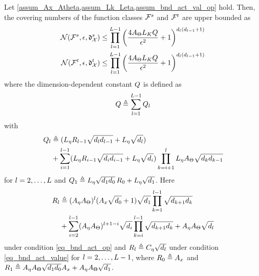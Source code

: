 \documentclass[review,supplement,onefignum,onetabnum]{siamonline250211}
\begin{document}
\begin{lemma} 
    \label{lem_cov_num_Fs_Ft}
    Let \cref{assum_Ax_Atheta,assum_Lk_Leta,assum_bnd_act_val_op} hold. Then, the covering numbers of the function classes $\mathcal{F}^s$ and $\mathcal{F}^t$ are upper bounded as 
    \begin{equation*}
    \begin{split}
    \mathcal{N} (  \mathcal{F}^s, \epsilon, \mathfrak{d}^s_{\mathcal{X}} ) \leq \prod_{l=1}^{L-1}  \left( \frac{4 {A_\Theta}  L_K {Q}}{\epsilon^2}+1  \right)^{ {d_l}({d_{l-1}}+1) } \\
    \mathcal{N}(  \mathcal{F}^t, \epsilon, \mathfrak{d}^t_{\mathcal{X}} ) \leq \prod_{l=1}^{L-1}  \left( \frac{4 {A_\Theta}  L_K {Q}}{\epsilon^2}+1  \right)^{ {d_l}({d_{l-1}}+1) }
    \end{split}
    \end{equation*}
    where the dimension-dependent constant ${Q}$ is defined as
    \begin{equation*}
    \begin{split}
    {Q} \triangleq 
    \sum_{l=1}^{L-1} {Q_l}
    \end{split}
    \end{equation*}
    with
    \begin{equation}
    \label{eq_defn_Ql}
    \begin{split}
    {Q_l}
    &\triangleq 
    ({L_\eta} {R_{l-1}} \sqrt{{d_l} {d_{l-1}}}+ {L_\eta} \sqrt{{d_l}}) \\
    &+
    \sum_{i=1}^{l-1}
    ({L_\eta} {R_{i-1}} \sqrt{{d_i} {d_{i-1}}}
    + {L_\eta} \sqrt{{d_i}})
    \prod_{k=i+1}^{l}
    {L_\eta} {A_\Theta} \sqrt{{d_k} {d_{k-1}}}
    \end{split}
    \end{equation}
    for $l=2, \dots, L$ and 
    ${Q_1} \triangleq 
    {L_\eta} \sqrt{{d_1} {d_0}} \, {R_0}  +{L_\eta} \sqrt{{d_1}} $.
     Here
    \begin{equation*}
    \begin{split}
    {R_l} &\triangleq
    ({A_\eta} {A_\Theta}) ^l  ({A_x} \sqrt{{d_0}}+1) \sqrt{{d_1}}
    \prod_{k=1}^{l-1} \sqrt{{d_{k+1}} {d_k}} \\
    &+
    \sum_{i=2}^{l-1} ({A_\eta} {A_\Theta})^{l+1-i} \sqrt{{d_i}}
    \prod_{k=i}^{l-1} \sqrt{{d_{k+1}} {d_k}}
    +
    {A_\eta} {A_\Theta} \sqrt{{d_l}}
    \end{split}
    \end{equation*}
    under condition  \eqref{eq_bnd_act_op}
    and ${R_l} \triangleq{C_\eta} \sqrt{{d_l}} $ under condition \eqref{eq_bnd_act_value} for $l=2, \dots, L-1$, where ${R_0} \triangleq {A_x}$ and ${R_1} \triangleq {A_\eta}  {A_\Theta} \sqrt{{d_1} {d_0}}  {A_x} +  {A_\eta} {A_\Theta} \sqrt{{d_1}}$. 
\end{lemma} 
    
\end{document}
